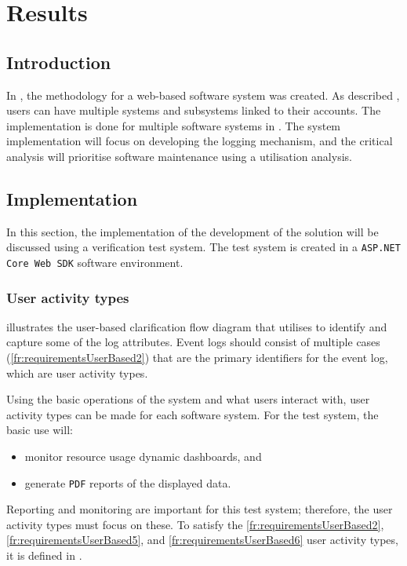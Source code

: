 \chapter{Results}
\label{chap:3}

\section{Introduction}
In , the methodology for a web-based software system was created. As described , users can have multiple systems and subsystems linked to their accounts. The implementation is done for multiple software systems in . The system implementation will focus on developing the logging mechanism, and the critical analysis will prioritise software maintenance using a utilisation analysis.

\section{Implementation}\label{sec:ch3_implementation}
In this section, the implementation of the development of the solution will be discussed using a verification test system. The test system is created in a \texttt{ASP.NET Core Web SDK} software environment.

\subsection{User activity types}
 illustrates the user-based clarification flow diagram that utilises  to identify and capture some of the log attributes. Event logs should consist of multiple cases (\ref{fr:requirementsUserBased2}) that are the primary identifiers for the event log, which are user activity types.\par Using the basic operations of the system and what users interact with, user activity types can be made for each software system. For the test system, the basic use will:

\begin{itemize}
	\item monitor resource usage dynamic dashboards, and
	\item generate \texttt{PDF} reports of the displayed data.
\end{itemize}

Reporting and monitoring are important for this test system; therefore, the user activity types must focus on these. To satisfy the \ref{fr:requirementsUserBased2}, \ref{fr:requirementsUserBased5}, and \ref{fr:requirementsUserBased6} user activity types, it is defined in .

